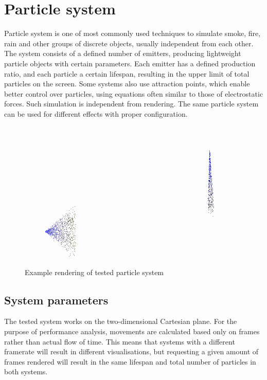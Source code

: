\chapter{Particle system}
\label{cha:particlesystem}

Particle system is one of most commonly used techniques to simulate smoke, fire, rain and other groups of discrete objects, usually independent from each other. The system consists of a defined number of emitters, producing lightweight particle objects with certain parameters. Each emitter has a defined production ratio, and each particle a certain lifespan, resulting in the upper limit of total particles on the screen. Some systems also use attraction points, which enable better control over particles, using equations often similar to those of electrostatic forces.
Such simulation is independent from rendering. The same particle system can be used for different effects with proper configuration.

\begin{figure}[h!]
  \caption{Example rendering of tested particle system}
  \label{img:particles}
  \centering
	\includegraphics[width=16cm]{particles}
\end{figure}

\section{System parameters}
\label{sec:emittersparameters}

The tested system works on the two-dimensional Cartesian plane. For the purpose of performance analysis, movements are calculated based only on frames rather than actual flow of time. This means that systems with a different framerate will result in different visualisations, but requesting a given amount of frames rendered will result in the same lifespan and total number of particles in both systems.

